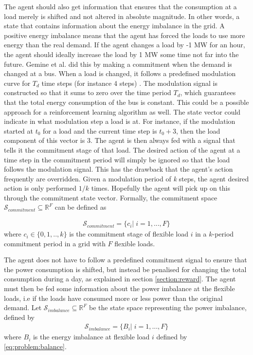 \documentclass[class=book, crop=false]{standalone}
\begin{document}
The agent should also get information that ensures that the consumption at a load merely is shifted and not altered in absolute magnitude. In other words, a state that contains information about the energy imbalance in the grid. A positive energy imbalance means that the agent has forced the loads to use more energy than the real demand. If the agent changes a load by -1 MW for an hour, the agent should ideally increase the load by 1 MW some time not far into the future. Gemine et al. did this by making a commitment when the demand is changed at a bus. When a load is changed, it follows a predefined modulation curve for $T_{d}$ time steps (for instance 4 steps) \cite{active_network_management}. The modulation signal is constructed so that it sums to zero over the time period $T_{d}$, which guarantees that the total energy consumption of the bus is constant. This could be a possible approach for a reinforcement learning algorithm as well. The state vector could indicate in what modulation step a load is at. For instance, if the modulation started at $t_{0}$ for a load and the current time step is $t_{0} + 3$, then the load component of this vector is 3. The agent is then always fed with a signal that tells it the commitment stage of that load. The desired action of the agent at a time step in the commitment period will simply be ignored so that the load follows the modulation signal. This has the drawback that the agent's action frequently are overridden. Given a modulation period of \textit{k} steps, the agent desired action is only performed $1/k$ times. Hopefully the agent will pick up on this through the commitment state vector. Formally, the commitment space $\mathcal{S}_{commitment} \subseteq \mathbb{R}^{F}$ can be defined as



\begin{equation}
   \begin{aligned}
   \label{eq:problem:commitment_state}
\mathcal{S}_{commitment} = \{ c_{i} | \;i = 1,...,F\}
    \end{aligned} 
\end{equation}
where $c_{i} \in \{0,1,..,k\}$ is the commitment stage of flexible load $i$ in a $k$-period commitment period in a grid with $F$ flexible loads.

The agent does not have to follow a predefined commitment signal to ensure that the power consumption is shifted, but instead be penalised for changing the total consumption during a day, as explained in section \ref{section:reward}. The agent must then be fed some information about the power imbalance at the flexible loads, i.e if the loads have consumed more or less power than the original demand. Let  $\mathcal{S}_{imbalance} \subseteq \mathbb{R}^{F}$  be the state space representing the power imbalance, defined by \begin{equation}
   \begin{aligned}
   \label{eq:problem:imbalance_state}
\mathcal{S}_{imbalance} = \{ B_{i} |\; i = 1,...,F\}
    \end{aligned} 
\end{equation}
where $B_{i}$ is the energy imbalance at flexible load $i$ defined by \eqref{eq:problem:balance}.
\end{document}
